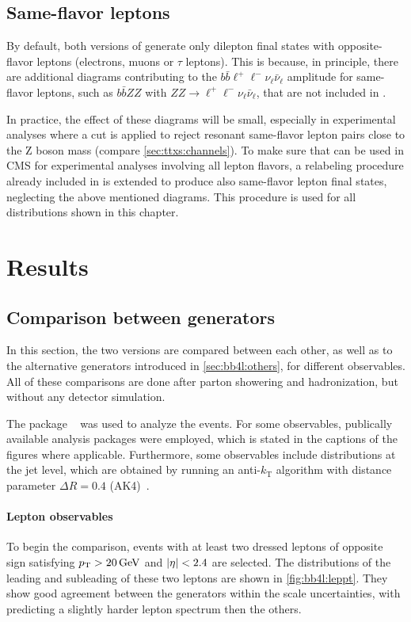 \subsection{Same-flavor leptons}
\label{sec:bb4l:sameflavor}

By default, both versions of \bbfourl generate only dilepton final states with opposite-flavor leptons (electrons, muons or $\tau$ leptons). This is because, in principle, there are additional diagrams contributing to the $b \bar{b} \ell^+ \ell^- \nu_\ell \bar{\nu}_\ell$ amplitude for same-flavor leptons, such as $b \bar{b} ZZ$ with $ZZ \rightarrow \ell^+ \ell^- \nu_\ell \bar{\nu}_\ell$, that are not included in \bbfourl.

In practice, the effect of these diagrams will be small, especially in experimental analyses where a cut is applied to reject resonant same-flavor lepton pairs close to the Z boson mass (compare \cref{sec:ttxs:channels}). To make sure that \bbfourl can be used in CMS for experimental analyses involving all lepton flavors, a relabeling procedure already included in \bbfourl is extended to produce also same-flavor lepton final states, neglecting the above mentioned diagrams. This procedure is used for all \bbfourl distributions shown in this chapter.

\section{Results}

\subsection{Comparison between generators}

In this section, the two \bbfourl versions are compared between each other, as well as to the alternative generators introduced in \cref{sec:bb4l:others}, for different observables. All of these comparisons are done after parton showering and hadronization, but without any detector simulation.

The package \rivet~\cite{Rivet:2019rhm} was used to analyze the events. For some observables, publically available analysis packages were employed, which is stated in the captions of the figures where applicable. Furthermore, some observables include distributions at the jet level, which are obtained by running an anti-$k_\mathrm{T}$ algorithm with distance parameter $\Delta R = 0.4$ (AK4)~\cite{Cacciari:2008gp}.

\paragraph{Lepton observables} To begin the comparison, events with at least two dressed leptons of opposite sign satisfying $\pt > \SI{20}{\GeV}$ and $|\eta| < 2.4$ are selected. The \pt distributions of the leading and subleading of these two leptons are shown in \cref{fig:bb4l:leppt}. They show good agreement between the generators within the scale uncertainties, with \tttWsum predicting a slightly harder lepton spectrum then the others.

